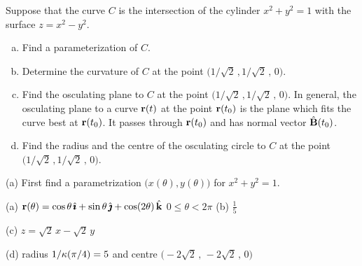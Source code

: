 \begin{question}
Suppose that  the curve $C$ is the intersection of the cylinder $x^2 +y^2 = 1$ 
with the surface  $z =x^2 - y^2$.
\begin{enumerate}[(a)]
\item 
Find a parameterization of $C$.

\item
Determine the curvature of $C$ at the point
            $\big(1/\sqrt{2}\,,1/\sqrt{2}\,,\,0\big)$.

\item
Find the osculating plane to $C$ at the point $\big(1/\sqrt{2}\,,1/\sqrt{2}\,,\,0\big)$.
In general, the osculating plane to a curve $\mathbf{r}(t)$ at the point
$\mathbf{r}(t_0)$ is the plane which fits the curve best at $\mathbf{r}(t_0)$.
It passes through $\mathbf{r}(t_0)$ and has normal vector $\hat{\mathbf{B}}(t_0)$.

\item 
Find the radius and the centre of the osculating circle to $C$ at the 
point $\big(1/\sqrt{2}\,,1/\sqrt{2}\,,\,0\big)$.
\end{enumerate}
\end{question}

\begin{hint} 
(a) First find a parametrization $\big(x(\theta),y(\theta)\big)$
for  $x^2+y^2=1$.
\end{hint}

\begin{answer} 
(a) $\mathbf{r}(\theta) =\cos\theta\,\hat{\pmb{\imath}} +\sin\theta\,\hat{\pmb{\jmath}} + \cos(2\theta)\,\hat{\mathbf{k}}$
                        \qquad $0\le\theta<2\pi$\qquad 
(b) $\frac{1}{5}$

(c) $z =\sqrt{2}\,x-\sqrt{2}\,y$

(d) radius $1/\kappa(\pi/4)=5$ and centre
            $\big(-2\sqrt{2}\,,\,-2\sqrt{2}\,,\,0\big)$
\end{answer}



